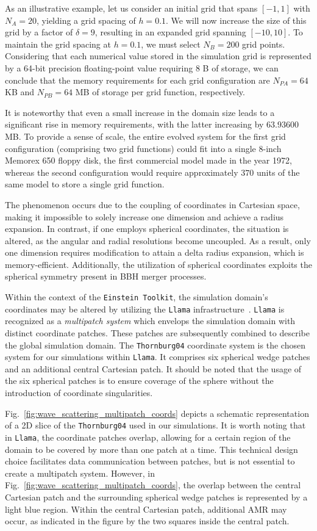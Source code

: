 As an illustrative example, let us consider an initial grid that spans $[-1,1]$ with $N_A=20$, yielding a grid spacing of $h=0.1$. We will now increase the size of this grid by a factor of $\delta=9$, resulting in an expanded grid spanning $[-10,10]$. To maintain the grid spacing at $h=0.1$, we must select $N_B=200$ grid points. Considering that each numerical value stored in the simulation grid is represented by a 64-bit precision floating-point value requiring 8 B of storage, we can conclude that the memory requirements for each grid configuration are $N_{PA}=64$ KB and $N_{PB}=64$ MB of storage per grid function, respectively.

It is noteworthy that even a small increase in the domain size leads to a significant rise in memory requirements, with the latter increasing by $63.93600$ MB. To provide a sense of scale, the entire evolved system for the first grid configuration (comprising two grid functions) could fit into a single 8-inch Memorex 650 floppy disk, the first commercial model made in the year 1972, whereas the second configuration would require approximately $370$ units of the same model to store a single grid function.

The phenomenon occurs due to the coupling of coordinates in Cartesian space, making it impossible to solely increase one dimension and achieve a radius expansion. In contrast, if one employs spherical coordinates, the situation is altered, as the angular and radial resolutions become uncoupled. As a result, only one dimension requires modification to attain a delta radius expansion, which is memory-efficient. Additionally, the utilization of spherical coordinates exploits the spherical symmetry present in BBH merger processes.

Within the context of the \texttt{Einstein Toolkit}, the simulation domain's coordinates may be altered by utilizing the \texttt{Llama} infrastructure~\cite{Reisswig2010}. \texttt{Llama} is recognized as a \textit{multipatch system} which envelops the simulation domain with distinct coordinate patches. These patches are subsequently combined to describe the global simulation domain. The \texttt{Thornburg04} coordinate system is the chosen system for our simulations within \texttt{Llama}. It comprises six spherical wedge patches and an additional central Cartesian patch. It should be noted that the usage of the six spherical patches is to ensure coverage of the sphere without the introduction of coordinate singularities.

Fig.~\ref{fig:wave_scattering_multipatch_coords} depicts a schematic representation of a 2D slice of the \texttt{Thornburg04} used in our simulations. It is worth noting that in \texttt{Llama}, the coordinate patches overlap, allowing for a certain region of the domain to be covered by more than one patch at a time. This technical design choice facilitates data communication between patches, but is not essential to create a multipatch system. However, in Fig.~\ref{fig:wave_scattering_multipatch_coords}, the overlap between the central Cartesian patch and the surrounding spherical wedge patches is represented by a light blue region. Within the central Cartesian patch, additional AMR may occur, as indicated in the figure by the two squares inside the central patch.

